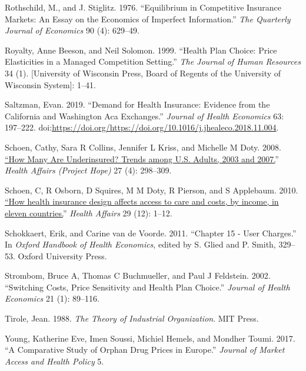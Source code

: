 \documentclass[a4paper,12pt]{article}
\begin{document}
\hypertarget{citeproc_bib_item_37}{Rothschild, M., and J. Stiglitz. 1976. “Equilibrium in Competitive Insurance Markets: An Essay on the Economics of Imperfect Information.” \textit{The Quarterly Journal of Economics} 90 (4): 629–49.}

\hypertarget{citeproc_bib_item_38}{Royalty, Anne Beeson, and Neil Solomon. 1999. “Health Plan Choice: Price Elasticities in a Managed Competition Setting.” \textit{The Journal of Human Resources} 34 (1). [University of Wisconsin Press, Board of Regents of the University of Wisconsin System]: 1–41.}

\hypertarget{citeproc_bib_item_39}{Saltzman, Evan. 2019. “Demand for Health Insurance: Evidence from the California and Washington Aca Exchanges.” \textit{Journal of Health Economics} 63: 197–222. doi:\url{https://doi.org/https://doi.org/10.1016/j.jhealeco.2018.11.004}.}

\hypertarget{citeproc_bib_item_40}{Schoen, Cathy, Sara R Collins, Jennifer L Kriss, and Michelle M Doty. 2008. \href{https://www.ncbi.nlm.nih.gov/pubmed/18544591}{“How Many Are Underinsured? Trends among U.S. Adults, 2003 and 2007.}” \textit{Health Affairs (Project Hope)} 27 (4): 298–309.}

\hypertarget{citeproc_bib_item_41}{Schoen, C, R Osborn, D Squires, M M Doty, R Pierson, and S Applebaum. 2010. \href{https://www.ncbi.nlm.nih.gov/pubmed/21088012}{“How health insurance design affects access to care and costs, by income, in eleven countries.}” \textit{Health Affairs} 29 (12): 1–12.}

\hypertarget{citeproc_bib_item_42}{Schokkaert, Erik, and Carine van de Voorde. 2011. “Chapter 15 - User Charges.” In \textit{Oxford Handbook of Health Economics}, edited by S. Glied and P. Smith, 329–53. Oxford University Press.}

\hypertarget{citeproc_bib_item_43}{Strombom, Bruce A, Thomas C Buchmueller, and Paul J Feldstein. 2002. “Switching Costs, Price Sensitivity and Health Plan Choice.” \textit{Journal of Health Economics} 21 (1): 89–116.}

\hypertarget{citeproc_bib_item_44}{Tirole, Jean. 1988. \textit{The Theory of Industrial Organization}. MIT Press.}

\hypertarget{citeproc_bib_item_45}{Young, Katherine Eve, Imen Soussi, Michiel Hemels, and Mondher Toumi. 2017. “A Comparative Study of Orphan Drug Prices in Europe.” \textit{Journal of Market Access and Health Policy} 5.}



\newpage
\appendix
\end{document}
